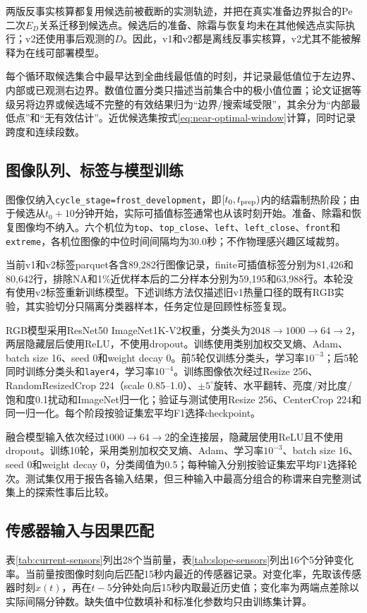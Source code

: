 \documentclass[UTF8,11pt,a4paper]{ctexart}
\begin{document}
两版反事实核算都复用候选前被截断的实测轨迹，并把在真实准备边界拟合的Pe二次$E_D$关系迁移到候选点。候选后的准备、除霜与恢复均未在其他候选点实际执行；v2还使用事后观测的$D$。因此，v1和v2都是离线反事实核算，v2尤其不能被解释为在线可部署模型。

每个循环取候选集合中最早达到全曲线最低值的时刻，并记录最低值位于左边界、内部或已观测右边界。数值位置分类只描述当前集合中的极小值位置；论文证据等级另将边界或候选域不完整的有效结果归为“边界/搜索域受限”，其余分为“内部最低点”和“无有效估计”。近优候选集按式\eqref{eq:near-optimal-window}计算，同时记录跨度和连续段数。

\subsection{图像队列、标签与模型训练}
图像仅纳入\texttt{cycle\_stage=frost\_development}，即$[t_0,t_{\rm prep})$内的结霜制热阶段；由于候选从$t_0+10$分钟开始，实际可插值标签通常也从该时刻开始。准备、除霜和恢复图像均不纳入。六个机位为\texttt{top}、\texttt{top\_close}、\texttt{left}、\texttt{left\_close}、\texttt{front}和\texttt{extreme}，各机位图像的中位时间间隔均为30.0秒；不作物理感兴趣区域裁剪。

当前v1和v2标签parquet各含89,282行图像记录，finite可插值标签分别为81,426和80,642行，排除NA和1\%近优样本后的二分样本分别为59,195和63,988行。本轮没有使用v2标签重新训练模型。下述训练方法仅描述旧v1热量口径的既有RGB实验，其实验切分只隔离分类器样本，任务定位是回顾性标签复现。

RGB模型采用ResNet50 ImageNet1K-V2权重，分类头为$2048\rightarrow1000\rightarrow64\rightarrow2$，两层隐藏层后使用ReLU，不使用dropout。训练使用类别加权交叉熵、Adam、batch size 16、seed 0和weight decay 0。前5轮仅训练分类头，学习率$10^{-3}$；后5轮同时训练分类头和\texttt{layer4}，学习率$10^{-4}$。训练图像依次经过Resize 256、RandomResizedCrop 224（scale 0.85--1.0）、$\pm5^\circ$旋转、水平翻转、亮度/对比度/饱和度0.1扰动和ImageNet归一化；验证与测试使用Resize 256、CenterCrop 224和同一归一化。每个阶段按验证集宏平均F1选择checkpoint。

融合模型输入依次经过$1000\rightarrow64\rightarrow2$的全连接层，隐藏层使用ReLU且不使用dropout。训练10轮，采用类别加权交叉熵、Adam、学习率$10^{-3}$、batch size 16、seed 0和weight decay 0，分类阈值为0.5；每种输入分别按验证集宏平均F1选择轮次。测试集仅用于报告各输入结果，但三种输入中最高分组合的称谓来自完整测试集上的探索性事后比较。

\subsection{传感器输入与因果匹配}
表\ref{tab:current-sensors}列出28个当前量，表\ref{tab:slope-sensors}列出16个5分钟变化率。当前量按图像时刻向后匹配15秒内最近的传感器记录。对变化率，先取该传感器时刻$x(t)$，再在$t-5$分钟处向后15秒内取最近历史值；变化率为两端点差除以实际间隔分钟数。缺失值中位数填补和标准化参数均只由训练集计算。
\end{document}
